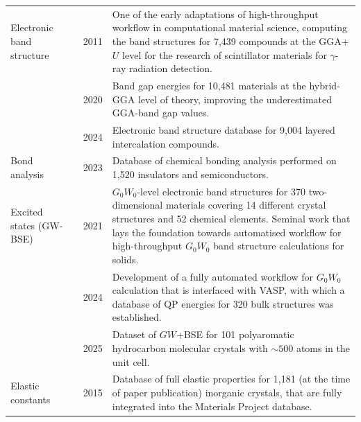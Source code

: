 \begin{longtable}{p{2cm}p{3cm}p{0.9cm}p{11cm}}
\footnotesize{Electronic band structure}
&\footnotesize{\citet{setyawan2011high}}
&\footnotesize{2011}
&\footnotesize{One of the early adaptations of high-throughput workflow in computational material science, computing the band structures for 7,439 compounds at the GGA+$U$ level for the research of scintillator materials for $\gamma$-ray radiation detection.}\\

&\footnotesize{\citet{kim2020band}} 
&\footnotesize{2020}
&\footnotesize{Band gap energies for 10,481 materials at the hybrid-GGA level of theory, improving the underestimated GGA-band gap values.}\\

&\footnotesize{\citet{kawaguchi2024band}}
&\footnotesize{2024}
&\footnotesize{Electronic band structure database for 9,004 layered intercalation
compounds.}\\

\footnotesize{Bond analysis}
&\footnotesize{\citet{naik2023quantum}}
&\footnotesize{2023}
&\footnotesize{Database of chemical bonding analysis performed on 1,520 insulators and semiconductors.} \\

\footnotesize{Excited states (GW-BSE)}

&\footnotesize{\citet{rasmussen2021towards}}
&\footnotesize{2021}
&\footnotesize{$G_{0}W_{0}$-level electronic band structures for 370 two-dimensional materials covering 14 different crystal structures
and 52 chemical elements. Seminal work that lays the foundation towards automatised workflow for high-throughput $G_{0}W_{0}$ band structure calculations for solids.}\\

&\footnotesize{\citet{varrassi2024automated}}
&\footnotesize{2024} 
&\footnotesize{Development of a fully automated workflow for $G_0W_0$ calculation that is interfaced with VASP, with which a database of QP energies for 320 bulk structures was established.} \\

&\footnotesize{\citet{gao2025pah101}}
&\footnotesize{2025}
&\footnotesize{Dataset of $GW$+BSE for 101 polyaromatic hydrocarbon molecular crystals with $\sim 500$ atoms in the unit cell.}\\

\footnotesize{Elastic constants}
&\footnotesize{\citet{deJong2015_elastic_MP}}
&\footnotesize{2015}
&\footnotesize{Database of full elastic properties for 1,181 (at the time of paper publication) inorganic crystals, that are fully integrated into the Materials Project database.}\\


\end{longtable}
